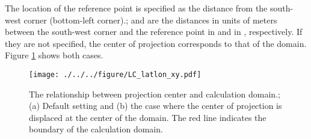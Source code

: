 The location of the reference point is specified as the distance from the south-west corner (bottom-left corner).;
 and  are the distances in units of meters between the south-west corner and the reference point in \XDIR and in \YDIR, respectively.
If they are not specified, the center of projection corresponds to that of the domain.
Figure \ref{fig:map_lc} shows both cases.

\begin{figure}[t]
\begin{center}
  \texttt{[image: ./../../figure/LC\_latlon\_xy.pdf]}\\
  \caption{The relationship between projection center and calculation domain.; (a) Default setting and (b) the case where the center of projection is displaced at the center of the domain.
    The red line indicates the boundary of the calculation domain.}
  \label{fig:map_lc}
\end{center}
\end{figure}


